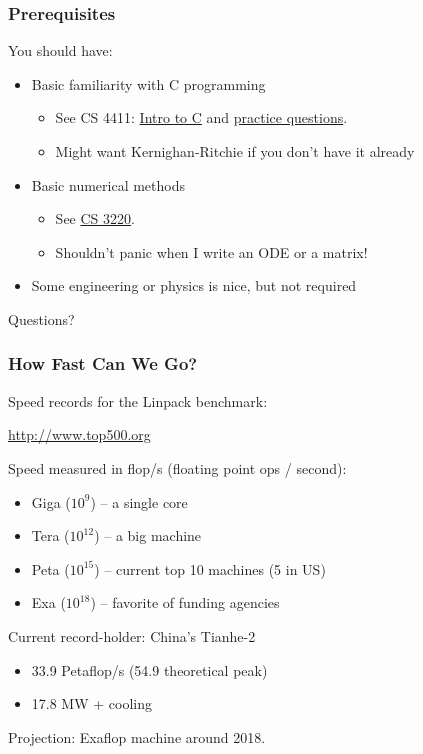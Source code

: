 \documentclass{beamer}
\begin{document}
\begin{frame}
  \frametitle{Prerequisites}

  You should have:
  \begin{itemize}
  \item Basic familiarity with C programming
    \begin{itemize}
    \item See CS 4411:
      \href{http://www.cs.cornell.edu/courses/cs4410/2010fa/CS4411/slides/intro_to_c/intro_to_c.pdf}{Intro to C} and
      \href{http://www.cs.cornell.edu/courses/cs4410/2010fa/CS4411/slides/intro_to_c/questions/}{practice questions}.
    \item Might want Kernighan-Ritchie if you don't have it already
    \end{itemize}
  \item Basic numerical methods
    \begin{itemize}
    \item See \href{http://www.cs.cornell.edu/~bindel/class/cs3220-s11}{CS 3220}.
    \item Shouldn't panic when I write an ODE or a matrix!
    \end{itemize}
  \item Some engineering or physics is nice, but not required
  \end{itemize}

\end{frame}


\begin{frame}
  \begin{center}
    Questions?
  \end{center}
\end{frame}


\begin{frame}
  \frametitle{How Fast Can We Go?}
  
  Speed records for the Linpack benchmark:
  \begin{center}
  {\small \url{http://www.top500.org}}
  \end{center}

  \vspace{1cm}
  Speed measured in flop/s (floating point ops / second):
  \begin{itemize}
  \item Giga ($10^9$) -- a single core
  \item Tera ($10^{12}$) -- a big machine
  \item Peta ($10^{15}$) -- current top 10 machines (5 in US)
  \item Exa ($10^{18}$) -- favorite of funding agencies
  \end{itemize}
  Current record-holder: China's Tianhe-2 
  \begin{itemize}
  \item 33.9 Petaflop/s (54.9 theoretical peak)
  \item 17.8 MW + cooling
  \end{itemize}

  \vspace{5mm}
  Projection: Exaflop machine around 2018.
\end{frame}
\end{document}
